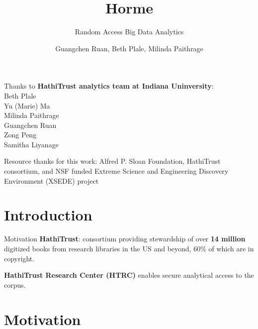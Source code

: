\documentclass[newPxFont]{beamer}
\title{Horme}
\subtitle{Random Access Big Data Analytics}
\author{Guangchen Ruan, Beth Plale, Milinda Paithrage}
\institute{School of Informatics and Computing, Indiana University}
\begin{document}

%
%

\maketitle


%
%


\begin{frame}[c]{Thanks to}
 \textbf{HathiTrust analytics team at Indiana Uninversity}: \\
 Beth Plale \\
 Yu (Marie) Ma \\
 Milinda Paithrage \\
 Guangchen Ruan \\
 Zong Peng \\
 Samitha Liyanage
 
 
\vspace{1em}

Resource thanks for this work:  Alfred P. Sloan Foundation, HathiTrust consortium, and NSF funded Extreme Science and Engineering Discovery Environment (XSEDE) project
\end{frame}

\section{Introduction}


\begin{frame}[c]{Motivation}
\textbf{HathiTrust}:  consortium providing stewardship of over \textbf{14 million} digitized books from research libraries in the US and beyond, 60\% of which are in copyright.  

\vspace{1em}
\textbf{HathiTrust Research Center (HTRC)} enables secure analytical access to the corpus.  
\end{frame}

\section{Motivation}
\end{document}
